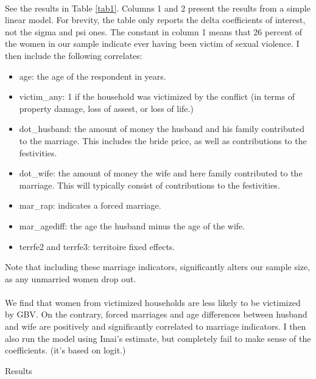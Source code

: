 \documentclass[11pt,a4paper]{scrartcl} %
\begin{document}
\paragraph{}
See the results in Table \ref{tab1}. Columns 1 and 2 present the results from a simple linear model. For brevity, the table only reports the delta coefficients of interest, not the sigma and psi ones. The constant in column 1 means that 26 percent of the women in our sample indicate ever having been victim of sexual violence. 
I then include the following correlates:
\begin{itemize}
	\item age: the age of the respondent in years.
	\item victim\_any: 1 if the household was victimized by the conflict (in terms of property damage, loss of assest, or loss of life.)
	\item dot\_husband: the amount of money the husband and his family contributed to the marriage. This includes the bride price, as well as contributions to the festivities.
	\item dot\_wife: the amount of money  the wife and here family contributed to the marriage. This will typically consist of contributions to the festivities.
	\item mar\_rap: indicates a forced marriage.
	\item mar\_agediff: the age the husband minus the age of the wife.
	\item terrfe2 and terrfe3: territoire fixed effects.
\end{itemize}

Note that including these marriage indicators, significantly alters our sample size, as any unmarried women drop out.

\paragraph{}
We find that women from victimized households are less likely to be victimized by GBV. On the contrary, forced marriages and age differences between husband and wife are positively and significantly correlated to marriage indicators. I then also run the model using Imai's estimate, but completely fail to make sense of the coefficients. (it's based on logit.)

\begin{table}
	\caption{Results}\label{tab1}
	\begin{center}
	
	\end{center}
\end{table}



\clearpage 


%

\end{document}
